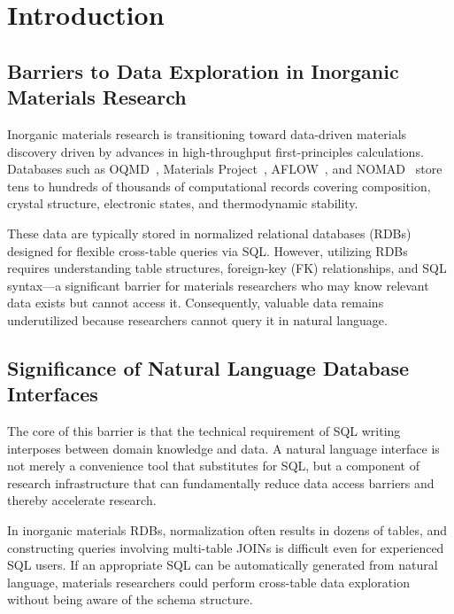 \documentclass{npj-compt.mater}
\begin{document}
\maketitle

\section{Introduction}
\label{sec:introduction}

\subsection{Barriers to Data Exploration in Inorganic Materials Research}

Inorganic materials research is transitioning toward data-driven materials discovery
driven by advances in high-throughput first-principles calculations.
Databases such as
OQMD~\cite{saal2013oqmd,kirklin2015oqmd},
Materials Project~\cite{jain2013mp},
AFLOW~\cite{curtarolo2012aflow}, and
NOMAD~\cite{draxl2019nomad}
store tens to hundreds of thousands of computational records covering
composition, crystal structure, electronic states, and thermodynamic stability.

These data are typically stored in normalized relational databases (RDBs)
designed for flexible cross-table queries via SQL.
However, utilizing RDBs requires understanding table structures,
foreign-key (FK) relationships, and SQL syntax---a significant barrier for
materials researchers who may know relevant data exists
but cannot access it.
Consequently, valuable data remains underutilized because researchers
cannot query it in natural language.

\subsection{Significance of Natural Language Database Interfaces}

The core of this barrier is that the technical requirement of SQL writing
interposes between domain knowledge and data.
A natural language interface is not merely a convenience tool that substitutes for SQL,
but a component of research infrastructure that can fundamentally
reduce data access barriers and thereby accelerate research.

In inorganic materials RDBs, normalization often results in dozens of tables,
and constructing queries involving multi-table JOINs is difficult even for experienced SQL users.
If an appropriate SQL can be automatically generated from natural language,
materials researchers could perform cross-table data exploration
without being aware of the schema structure.
\end{document}
